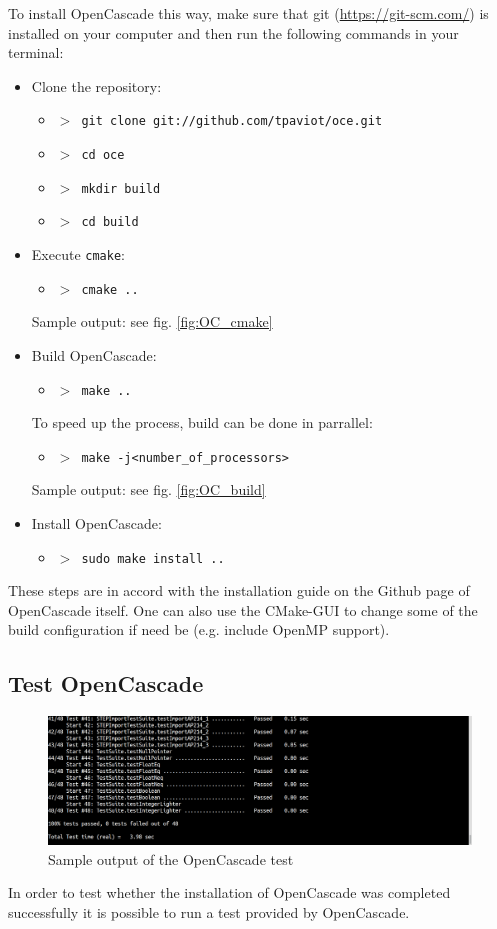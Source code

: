 \documentclass[
12pt, %
a4paper, %
oneside, %
headinclude,footinclude, %
BCOR5mm, %
]{scrartcl}
\begin{document}
To install OpenCascade this way, make sure that git (\href{https://git-scm.com/}{https://git-scm.com/}) is installed on your computer and then run the following commands in your terminal:
\begin{itemize}
\item Clone the repository:
\begin{itemize}
\item[] \texttt{\textbf{$>$ }git clone git://github.com/tpaviot/oce.git}
\item[] \texttt{\textbf{$>$ }cd oce}
\item[] \texttt{\textbf{$>$ }mkdir build}
\item[] \texttt{\textbf{$>$ }cd build}
\end{itemize}
\item Execute \texttt{cmake}:
\begin{itemize}
\item[] \texttt{\textbf{$>$ }cmake ..}
\end{itemize}
Sample output: see fig. \ref{fig:OC_cmake}
\item Build OpenCascade:
\begin{itemize}
\item[] \texttt{\textbf{$>$ }make ..}
\end{itemize}
To speed up the process, build can be done in parrallel:
\begin{itemize}
\item[] \texttt{\textbf{$>$ }make -j<number\_of\_processors>}
\end{itemize}
Sample output: see fig. \ref{fig:OC_build}
\item Install OpenCascade:
\begin{itemize}
\item[] \texttt{\textbf{$>$ }sudo make install ..}
\end{itemize}
\end{itemize}

	 These steps are in accord with the installation guide on the Github page of OpenCascade itself. One can also use the CMake-GUI to change some of the build configuration if need be (e.g. include OpenMP support).
	

\subsection{Test OpenCascade}
\begin{figure}
\centering
\includegraphics[scale=0.3]{img/OC_Test2_cropped.png}
\caption{Sample output of the OpenCascade test}
\label{fig:OC_test}
\end{figure}
In order to test whether the installation of OpenCascade was completed successfully it is possible to run a test provided by OpenCascade. 
\end{document}
